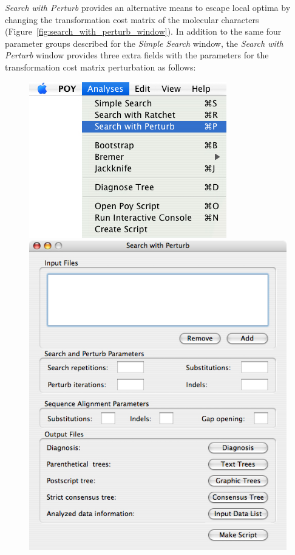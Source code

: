 \emph{Search with Perturb} provides an alternative means to escape local optima by changing
the transformation cost matrix of the molecular characters
(Figure~\ref{fig:search_with_perturb_window}). In addition to the
same four parameter groups described for the \emph{Simple Search} window, the \emph{Search
with Perturb} window provides three extra fields with the parameters for the
transformation cost matrix perturbation as follows:

\begin{figure}
\centering
\begin{minipage}[c]{0.48\textwidth}
   		\includegraphics[width=\textwidth]{figures/searchwithperturb_menu.jpg}
\end{minipage}
\quad
\begin{minipage}[c]{0.48\textwidth}
	   	\includegraphics[width=\textwidth]{figures/searchwithperturb_window.jpg}

\end{minipage}
\end{figure}
